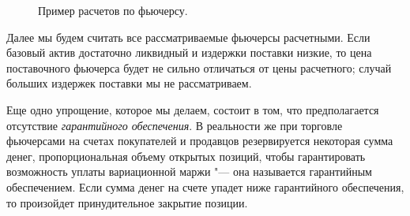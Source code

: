 \begin{figure}[h]
\caption{Пример расчетов по фьючерсу. }
\label{fut:fig}
\end{figure}

\begin{remark}
Далее мы будем считать все рассматриваемые фьючерсы расчетными.
Если базовый актив достаточно ликвидный и издержки поставки низкие, то цена поставочного фьючерса будет не сильно отличаться от цены расчетного; случай больших издержек поставки мы не рассматриваем.

Еще одно упрощение, которое мы делаем, состоит в том, что предполагается отсутствие \emph{гарантийного обеспечения}.
В реальности же при торговле фьючерсами на счетах покупателей и продавцов резервируется некоторая сумма денег, пропорциональная объему открытых позиций, чтобы гарантировать возможность уплаты вариационной маржи "--- она называется гарантийным обеспечением.
Если сумма денег на счете упадет ниже гарантийного обеспечения, то произойдет принудительное закрытие позиции.  
\end{remark}

